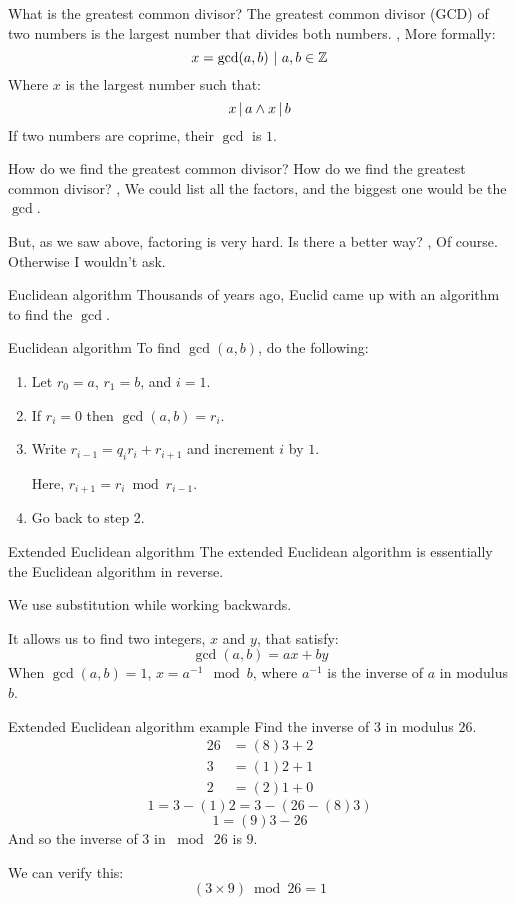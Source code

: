 \begin{namedframe}{What is the greatest common divisor?}
	The greatest common divisor (GCD) of two numbers is the largest number that divides both numbers.
	\sep
	More formally:
	\[x = \gcd(a, b) \ |\  a, b \in \mathbb{Z}\]
	Where $x$ is the largest number such that:
	\[x \operatorname{|} a \wedge x \operatorname{|} b\]
	\pause
	If two numbers are coprime, their $\gcd$ is $1$.
\end{namedframe}
\begin{namedframe}{How do we find the greatest common divisor?}
	How do we find the greatest common divisor?
	\sep
	We could list all the factors, and the biggest one would be the $\gcd$.

	But, as we saw above, factoring is very hard.
	Is there a better way?
	\sep
	Of course. Otherwise I wouldn't ask.
\end{namedframe}
\begin{namedframe}{Euclidean algorithm}
	Thousands of years ago, Euclid came up with an algorithm to find the $\gcd$.
	\begin{block}{Euclidean algorithm}
		To find $\gcd(a, b)$, do the following:
		\begin{enumerate}
			\item Let $r_0 = a$, $r_1 = b$, and $i = 1$.
			\item If $r_i = 0$ then $\gcd(a, b) = r_i$.
			\item Write $r_{i-1} = q_ir_i + r_{i+1}$ and increment $i$ by $1$.
			
			      Here, $r_{i+1} = r_i \bmod r_{i-1}$.
			\item Go back to step 2.
		\end{enumerate}
	\end{block}
\end{namedframe}
\begin{namedframe}{Extended Euclidean algorithm}
	The extended Euclidean algorithm is essentially the Euclidean algorithm in reverse.

	We use substitution while working backwards.

	It allows us to find two integers, $x$ and $y$, that satisfy:
	\[\gcd(a, b) = ax + by\]
	\pause
	When $\gcd(a, b) = 1$, $x = a^{-1} \mod b$, where $a^{-1}$ is the inverse of $a$ in modulus $b$.
\end{namedframe}
\begin{namedframe}{Extended Euclidean algorithm example}
	Find the inverse of $3$ in modulus $26$.
	\begin{align*}
		26 &= (8)3 + 2\\
		3  &= (1)2 + 1\\
		2  &= (2)1 + 0
	\end{align*}
	\pause
	\[1 = 3 - (1)2 = 3 - (26 - (8)3)\]
	\[1 = (9)3 - 26\]
	\pause
	And so the inverse of $3$ in $\bmod\ 26$ is $9$.
	
	We can verify this:
	\[(3 \times 9) \bmod 26 = 1\]
\end{namedframe}
